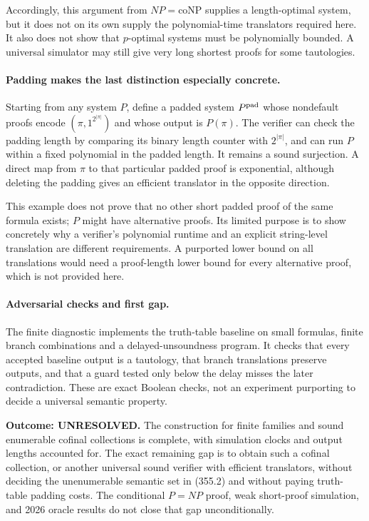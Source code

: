\documentclass[11pt]{article}
\begin{document}
Accordingly, this argument from $NP=\mathrm{coNP}$ supplies a
length-optimal system, but it does not on its own supply the
polynomial-time translators required here. It also does not show that
$p$-optimal systems must be polynomially bounded. A universal simulator
may still give very long shortest proofs for some tautologies.

\paragraph{Padding makes the last distinction especially concrete.}
Starting from any system $P$, define a padded system $P^{\rm pad}$
whose nondefault proofs encode $(\pi,1^{2^{|\pi|}})$ and whose output
is $P(\pi)$. The verifier can check the padding length by comparing
its binary length counter with $2^{|\pi|}$, and can run $P$ within a
fixed polynomial in the padded length. It remains a sound surjection.
A direct map from $\pi$ to that particular padded proof is exponential,
although deleting the padding gives an efficient translator in the
opposite direction.

This example does not prove that no other short padded proof of the
same formula exists; $P$ might have alternative proofs. Its limited
purpose is to show concretely why a verifier's polynomial runtime and
an explicit string-level translation are different requirements.
A purported lower bound on all translations would need a proof-length
lower bound for every alternative proof, which is not provided here.

\paragraph{Adversarial checks and first gap.}
The finite diagnostic implements the truth-table baseline on small
formulas, finite branch combinations and a delayed-unsoundness program.
It checks that every accepted baseline output is a tautology, that branch
translations preserve outputs, and that a guard tested only below the
delay misses the later contradiction. These are exact Boolean checks,
not an experiment purporting to decide a universal semantic property.

\textbf{Outcome: UNRESOLVED.} The construction for finite families and
sound enumerable cofinal collections is complete, with simulation clocks
and output lengths accounted for. The exact remaining gap is to obtain
such a cofinal collection, or another universal sound verifier with
efficient translators, without deciding the unenumerable semantic set
in (355.2) and without paying truth-table padding costs. The conditional
$P=NP$ proof, weak short-proof simulation, and 2026 oracle results do
not close that gap unconditionally.
\end{document}
